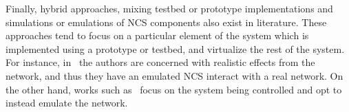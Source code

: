 Finally, hybrid approaches, mixing testbed or prototype implementations and simulations or emulations of \gls{NCS} components also exist in literature.
These approaches tend to focus on a particular element of the system which is implemented using a prototype or testbed, and virtualize the rest of the system.
For instance, in~\cite{wang2020inverter} the authors are concerned with realistic effects from the network, and thus they have an emulated \gls{NCS} interact with a real network.
On the other hand, works such as~\cite{natale2004inverted} focus on the system being controlled and opt to instead emulate the network.



